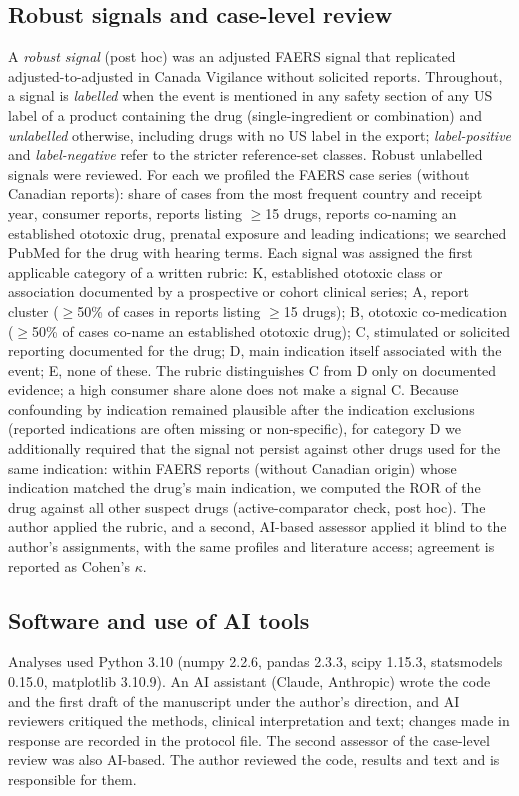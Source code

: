 \documentclass[11pt]{article}
\begin{document}
\subsection{Robust signals and case-level review}
A \emph{robust signal} (post hoc) was an adjusted FAERS signal that replicated adjusted-to-adjusted in Canada Vigilance
without solicited reports. Throughout, a signal is \emph{labelled} when the event is mentioned in any safety section of any US label of a product
containing the drug (single-ingredient or combination) and \emph{unlabelled} otherwise, including drugs with no US label in the
export; \emph{label-positive} and \emph{label-negative} refer to the stricter reference-set classes. Robust unlabelled signals
were reviewed. For each we profiled the FAERS case series (without Canadian reports):
share of cases from the most frequent country and receipt year, consumer reports, reports listing $\geq$15 drugs, reports
co-naming an established ototoxic drug, prenatal exposure and leading indications; we searched PubMed for the drug with
hearing terms. Each signal was assigned the first applicable category of a written rubric: K, established ototoxic class or
association documented by a prospective or cohort clinical series; A, report cluster ($\geq$50\% of cases in reports listing
$\geq$15 drugs); B, ototoxic co-medication ($\geq$50\% of cases co-name an established ototoxic drug); C, stimulated or
solicited reporting documented for the drug; D, main indication itself associated with the event; E, none of these. The
rubric distinguishes C from D only on documented evidence; a high consumer share alone does not make a signal C. Because
confounding by indication remained plausible after the indication exclusions (reported indications are often missing or
non-specific), for category D we additionally required that the signal not persist against other drugs used for the same indication: within
FAERS reports (without Canadian origin) whose indication matched the drug's main indication, we computed the ROR of the drug
against all other suspect drugs (active-comparator check, post hoc). The author applied the rubric, and a second, AI-based
assessor applied it blind to the author's assignments, with the same profiles and literature access; agreement is reported as
Cohen's $\kappa$.

\subsection{Software and use of AI tools}
Analyses used Python 3.10 (numpy 2.2.6, pandas 2.3.3, scipy 1.15.3, statsmodels 0.15.0, matplotlib 3.10.9). An AI
assistant (Claude, Anthropic) wrote the code and the first draft of the manuscript under the author's direction, and AI
reviewers critiqued the methods, clinical interpretation and text; changes made in response are recorded in the protocol
file. The second assessor of the case-level review was also AI-based. The author reviewed the code, results and text and is
responsible for them.
\end{document}
